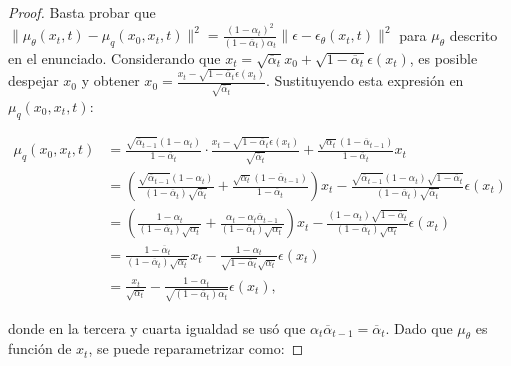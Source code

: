 \begin{proof}
    Basta probar que $\| \mu_\theta(x_t,t) - \mu_q(x_0,x_t,t) \|^2 = \frac{(1-\alpha_t)^2}{(1-\bar\alpha_t)\alpha_t} \| \epsilon - \epsilon_\theta(x_t,t) \|^2$ para $\mu_\theta$ descrito en el enunciado. Considerando que $x_t = \sqrt{\overline{\alpha}_t}x_0 + \sqrt{1-\overline{\alpha}_t}\epsilon(x_t)$, es posible despejar $x_0$ y obtener $x_0 = \frac{x_t - \sqrt{1-\overline{\alpha}_t}\epsilon(x_t)}{\sqrt{\overline{\alpha}_t}}$. Sustituyendo esta expresión en $\mu_q(x_0,x_t,t)$:

    \begin{align*}
        \mu_q(x_0,x_t,t) & = \frac{\sqrt{\overline{\alpha}_{t-1}}(1-\alpha_t)}{1-\overline{\alpha}_t}\cdot\frac{x_t - \sqrt{1-\overline{\alpha}_t}\epsilon(x_t)}{\sqrt{\overline{\alpha}_t}} + \frac{\sqrt{\alpha_t}(1-\overline{\alpha}_{t-1})}{1-\overline{\alpha}_t}x_t \\
                         & = \left(\frac{\sqrt{\overline{\alpha}_{t-1}}(1-\alpha_t)}{(1-\overline{\alpha}_t)\sqrt{\overline{\alpha}_t}} + \frac{\sqrt{\alpha_t}(1-\overline{\alpha}_{t-1})}{1-\overline{\alpha}_t}\right) x_t
        -\frac{\sqrt{\overline{\alpha}_{t-1}}(1-\alpha_t)\sqrt{1-\overline{\alpha}_t}}{(1-\overline{\alpha}_t)\sqrt{\overline{\alpha}_t}}\epsilon(x_t)                                                                                                                     \\
                         & = \left(\frac{1-\alpha_t}{(1-\overline{\alpha}_t)\sqrt{\alpha_t}} + \frac{\alpha_t - \alpha_t\overline{\alpha}_{t-1}}{(1-\overline{\alpha}_t)\sqrt{\alpha_t}}
        \right)x_t - \frac{(1-\alpha_t)\sqrt{1-\overline{\alpha}_t}}{(1-\overline{\alpha}_t)\sqrt{\alpha_t}}\epsilon(x_t)                                                                                                                                                  \\
                         & =\frac{1-\overline{\alpha}_t}{(1-\overline{\alpha}_t)\sqrt{\alpha_t}}x_t - \frac{1-\alpha_t}{\sqrt{1-\overline{\alpha}_t}\sqrt{\alpha_t}}\epsilon(x_t)                                                                                          \\
                         & =\frac{x_t}{\sqrt{\alpha_t}} - \frac{1-\alpha_t}{\sqrt{(1-\overline{\alpha}_t)\alpha_t}}\epsilon(x_t) ,
    \end{align*}

    donde en la tercera y cuarta igualdad se usó que $\alpha_t\overline{\alpha}_{t-1} = \overline{\alpha}_t$. Dado que $\mu_\theta$ es función de $x_t$, se puede reparametrizar como:


\end{proof}
